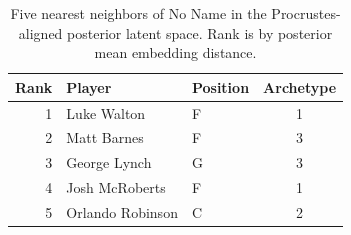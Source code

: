 \begin{table}[htbp]
  \centering\small
  \begin{tabular}{rllc}
    \toprule
    Rank & Player & Position & Archetype \\
    \midrule
    1 & Luke Walton & F & 1 \\
    2 & Matt Barnes & F & 3 \\
    3 & George Lynch & G & 3 \\
    4 & Josh McRoberts & F & 1 \\
    5 & Orlando Robinson & C & 2 \\
    \bottomrule
  \end{tabular}
  \caption{Five nearest neighbors of No Name in the Procrustes-aligned posterior latent space. Rank is by posterior mean embedding distance.}
  \label{tab:No_Name_neighbors}
\end{table}

